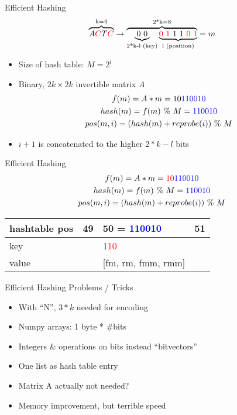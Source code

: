 \documentclass[nenglish]{beamer}
\begin{document}
\begin{frame}[fragile]{Efficient Hashing}
 \[
  \overbrace{
    A\textcolor{red}{C}T\textcolor{red}{C}
   }^\text{k=4}
   \rightarrow \overbrace{\underbrace{0\ 0}_\text{2*k-l (key)}\underbrace{\textcolor{red}{0\ 1}\ 1\ 1\ \textcolor{red}{0\ 1}}_\text{l (position)}}^\text{2*k=8} = m
 \] 
 \begin{itemize}
  \item Size of hash table: $M = 2^l$
  \item Binary, $2k \times 2k$ invertible matrix $A$
 \pause
 \begin{gather}
 f(m) = A * m = 10\textcolor{blue}{110010}\\
 hash(m) = f(m)\ \%\ M  = \textcolor{blue}{110010}\\
 pos(m,i) = (hash(m) + reprobe(i))\ \%\ M
 \end{gather}
 \pause
  \item $i+1$ is concatenated to the higher $2*k - l$ bits
  \end{itemize}
\end{frame}

\begin{frame}[fragile]{Efficient Hashing}
 \begin{gather}
 f(m) = A * m = \textcolor{red}{10}\textcolor{blue}{110010}\\
 hash(m) = f(m)\ \%\ M  = \textcolor{blue}{110010}\\
 pos(m,i) = (hash(m) + reprobe(i))\ \%\ M
 \end{gather}
 \pause
  \begin{table}
  \footnotesize
  \centering
\begin{tabular}{|l|l|l|l|}
\hline
hashtable pos & 49 & 50 = \textcolor{blue}{110010} & 51 \\ \hline
key   &  & 1\textcolor{red}{10} &  \\ \hline
value   &  & [fm, rm, fmm, rmm] &  \\ \hline
\end{tabular}
\end{table}
\end{frame}

\begin{frame}[fragile]{Efficient Hashing}
  Problems / Tricks
 \begin{itemize}
  \itemsep0.2cm
  \item With ``N'', $3*k$ needed for encoding
  \item Numpy arrays: 1 byte * \#bits
  \item Integers \& operations on bits instead ``bitvectors''
  \item One list as hash table entry
  \item Matrix A actually not needed?
  \item Memory improvement, but terrible speed 
 \end{itemize}
\end{frame}
\end{document}
